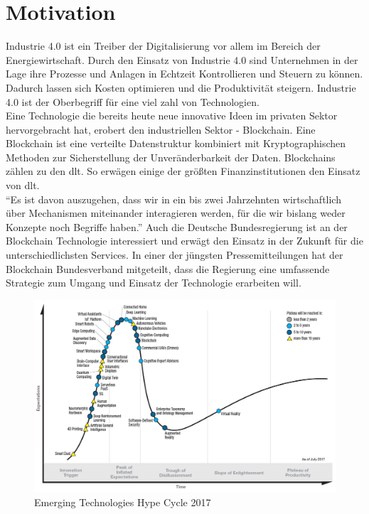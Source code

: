 \section{Motivation}

Industrie 4.0 ist ein Treiber der Digitalisierung vor allem im Bereich der Energiewirtschaft. \cite[vgl.]{UnternehmensbetreuungmbH2017} Durch den Einsatz von Industrie 4.0 sind Unternehmen in der Lage ihre Prozesse und Anlagen in Echtzeit Kontrollieren und Steuern zu können. Dadurch lassen sich Kosten optimieren und die Produktivität steigern. Industrie 4.0 ist der Oberbegriff für eine viel zahl von Technologien.\\
Eine Technologie die bereits heute neue innovative Ideen im privaten Sektor hervorgebracht hat, erobert den industriellen Sektor - Blockchain. Eine Blockchain ist eine verteilte Datenstruktur kombiniert mit Kryptographischen Methoden zur Sicherstellung der Unveränderbarkeit der Daten. Blockchains zählen zu den \ac{dlt}. So erwägen einige der größten Finanzinstitutionen den Einsatz von \ac{dlt}.\cite{Goldman2018}\cite{JPMorgan2018}\\

“Es ist davon auszugehen, dass wir in ein bis zwei Jahrzehnten wirtschaftlich über Mechanismen miteinander interagieren werden, für die wir bislang weder Konzepte noch Begriffe haben.” \cite[S.~92]{Platzer2014} Auch die Deutsche Bundesregierung ist an der Blockchain Technologie interessiert und erwägt den Einsatz in der Zukunft für die unterschiedlichsten Services. In einer der jüngsten Pressemitteilungen hat der Blockchain Bundesverband mitgeteilt, dass die Regierung eine umfassende Strategie zum Umgang und Einsatz der Technologie erarbeiten will. \cite{BCBundesverband2018}

\begin{figure}[h!]
	\centering
	\includegraphics[width=0.65\linewidth]{pictures/Gartner-Hype-Cycle-2017}
	\caption[Gartner Hype Cycle 2017]{Emerging Technologies Hype Cycle 2017\cite{Gartner2017}}
	\label{fig:gartner-hype-cycle-2017}
\end{figure}

